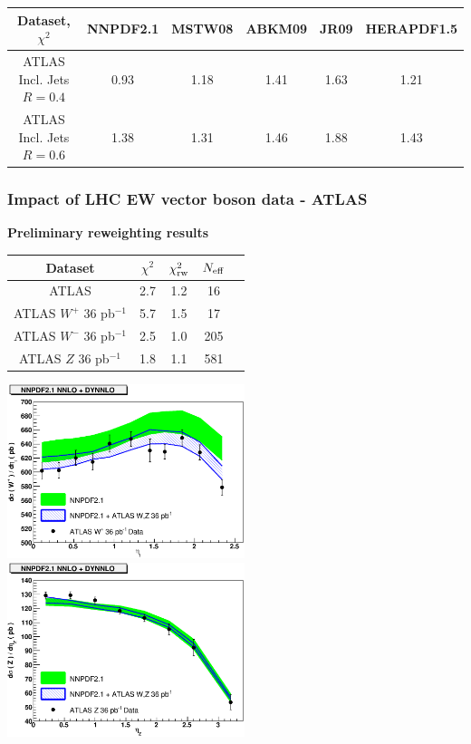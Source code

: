 \documentclass[10pt]{beamer}
\begin{document}
\begin{frame}
\begin{centering}
\end{centering}
\begin{table}[h]
\scriptsize
\begin{center}
\begin{tabular}{|c|c|c|c|c|c|}
\hline
Dataset, $\chi^2$    &   NNPDF2.1  &  MSTW08 & ABKM09  
&  JR09 &  HERAPDF1.5      \\  
\hline
\hline
ATLAS Incl. Jets   $R=0.4$    &  0.93  & 1.18   & 1.41 & 1.63 & 1.21     \\  
ATLAS Incl. Jets    $R=0.6$    & 1.38  & 1.31  & 1.46 &  1.88 & 1.43     \\  
\hline
\end{tabular}
\end{center}
\end{table}
\end{frame}

\begin{frame}
\frametitle{Impact of LHC EW vector boson data - ATLAS}
\textbf{\footnotesize Preliminary reweighting results}
\begin{table}[h]
\scriptsize
\begin{center}
\begin{tabular}{|c|c|c|c|c|}
\hline
Dataset  &  $\chi^2$  &  $\chi^2_{\rm rw} $ & $N_{\rm eff}$  \\
\hline
\hline
ATLAS   &  2.7  & 1.2   &  16   \\ 
\hline 
ATLAS $W^+$ 36 pb$^{-1}$     & 5.7    & 1.5  & 17   \\  
ATLAS $W^-$ 36 pb$^{-1}$      &  2.5  & 1.0  &  205  \\  
ATLAS $Z$ 36 pb$^{-1}$      &  1.8  & 1.1  & 581  \\  
\hline
\end{tabular}
\end{center}
\end{table}
\begin{center}
\includegraphics[width=0.52\textwidth]{dat-th-atlaswp}
\includegraphics[width=0.52\textwidth]{dat-th-atlasz}\\
\end{center}
\end{frame}
\end{document}
